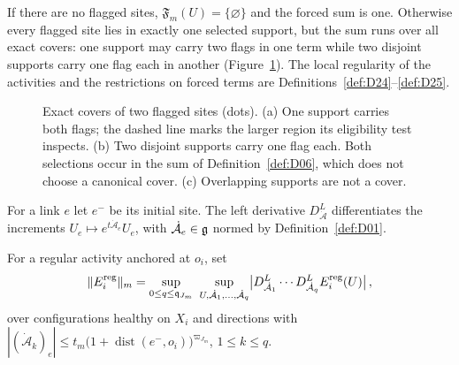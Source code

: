 If there are no flagged sites, $\mathfrak F_m(U)=\{\varnothing\}$ and the forced sum is one. Otherwise every flagged site lies in exactly one selected support, but the sum runs over all exact covers: one support may carry two flags in one term while two disjoint supports carry one flag each in another (Figure~\ref{fig:covers}). The local regularity of the activities and the restrictions on forced terms are Definitions~\ref{def:D24}--\ref{def:D25}.

\begin{figure}[ht]
\centering
{}
\caption{Exact covers of two flagged sites (dots). (a) One support carries both flags; the dashed line marks the larger region its eligibility test inspects. (b) Two disjoint supports carry one flag each. Both selections occur in the sum of Definition~\ref{def:D06}, which does not choose a canonical cover. (c) Overlapping supports are not a cover.}\label{fig:covers}
\end{figure}

For a link $e$ let $e^-$ be its initial site. The left derivative $D^L_{\dot{\mathcal A}}$ differentiates the increments $U_e\mapsto e^{t\dot{\mathcal A}_e}U_e$, with $\dot{\mathcal A}_e\in\mathfrak{g}$ normed by Definition~\ref{def:D01}.

\begin{definition}\label{def:D05a}
For a regular activity anchored at $o_i$, set
\begin{equation*}
\|E_i^{\rm reg}\|_m=
\sup_{0\le q\le\mathfrak q_{J_m}}\ \sup_{U,\dot{\mathcal A}_1,\ldots,\dot{\mathcal A}_q}
\bigl|D^L_{\dot{\mathcal A}_1}\cdots D^L_{\dot{\mathcal A}_q}E_i^{\rm reg}(U)\bigr|\,,
\end{equation*}
over configurations healthy on $X_i$ and directions with $|(\dot{\mathcal A}_k)_e|\le t_m\bigl(1+\operatorname{dist}(e^-,o_i)\bigr)^{\varpi_{J_m}}$, $1\le k\le q$.
\end{definition}

